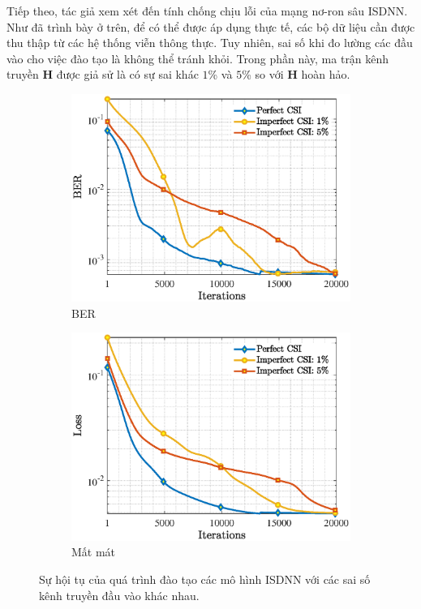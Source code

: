 Tiếp theo, tác giả xem xét đến tính chống chịu lỗi của mạng nơ-ron sâu ISDNN. Như đã trình bày ở trên, để có thể được áp dụng thực tế, các bộ dữ liệu cần được thu thập từ các hệ thống viễn thông thực. Tuy nhiên, sai số khi đo lường các đầu vào cho việc đào tạo là không thể tránh khỏi. Trong phần này, ma trận kênh truyền $\mathbf{H}$ được giả sử là có sự sai khác $1$\% và $5$\% so với $\mathbf{H}$ hoàn hảo. 
\begin{figure}[ht]
     \centering
     \begin{subfigure}[b]{0.48\textwidth}
         \centering
         \includegraphics[width=\textwidth]{figures/BER_2.eps}
         \caption{BER}
         \label{fig:ber_2}
     \end{subfigure}
     \hfill
     \begin{subfigure}[b]{0.48\textwidth}
         \centering
         \includegraphics[width=\textwidth]{figures/Loss_2.eps}
         \caption{Mất mát}
         \label{fig:loss_2}
     \end{subfigure}
     \hfill
        \caption{Sự hội tụ của quá trình đào tạo các mô hình ISDNN với các sai số kênh truyền đầu vào khác nhau.}
        \label{fig:training_2}
\end{figure}

